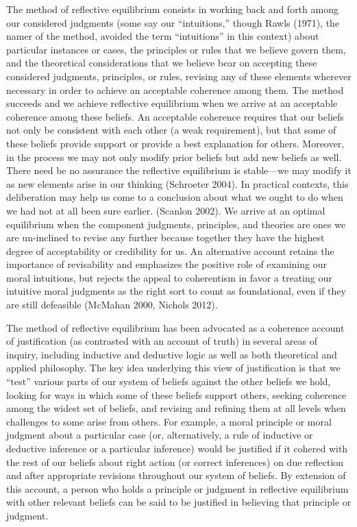 \documentclass[]{article}
\begin{document}
The method of reflective equilibrium consists in working back and forth
among our considered judgments (some say our ``intuitions,'' though
Rawls (1971), the namer of the method, avoided the term ``intuitions''
in this context) about particular instances or cases, the principles or
rules that we believe govern them, and the theoretical considerations
that we believe bear on accepting these considered judgments,
principles, or rules, revising any of these elements wherever necessary
in order to achieve an acceptable coherence among them. The method
succeeds and we achieve reflective equilibrium when we arrive at an
acceptable coherence among these beliefs. An acceptable coherence
requires that our beliefs not only be consistent with each other (a weak
requirement), but that some of these beliefs provide support or provide
a best explanation for others. Moreover, in the process we may not only
modify prior beliefs but add new beliefs as well. There need be no
assurance the reflective equilibrium is stable---we may modify it as new
elements arise in our thinking (Schroeter 2004). In practical contexts,
this deliberation may help us come to a conclusion about what we ought
to do when we had not at all been sure earlier. (Scanlon 2002). We
arrive at an optimal equilibrium when the component judgments,
principles, and theories are ones we are un-inclined to revise any
further because together they have the highest degree of acceptability
or credibility for us. An alternative account retains the importance of
revisability and emphasizes the positive role of examining our moral
intuitions, but rejects the appeal to coherentism in favor a treating
our intuitive moral judgments as the right sort to count as
foundational, even if they are still defeasible (McMahan 2000, Nichols
2012).

The method of reflective equilibrium has been advocated as a coherence
account of justification (as contrasted with an account of truth) in
several areas of inquiry, including inductive and deductive logic as
well as both theoretical and applied philosophy. The key idea underlying
this view of justification is that we ``test'' various parts of our
system of beliefs against the other beliefs we hold, looking for ways in
which some of these beliefs support others, seeking coherence among the
widest set of beliefs, and revising and refining them at all levels when
challenges to some arise from others. For example, a moral principle or
moral judgment about a particular case (or, alternatively, a rule of
inductive or deductive inference or a particular inference) would be
justified if it cohered with the rest of our beliefs about right action
(or correct inferences) on due reflection and after appropriate
revisions throughout our system of beliefs. By extension of this
account, a person who holds a principle or judgment in reflective
equilibrium with other relevant beliefs can be said to be justified in
believing that principle or judgment.
\end{document}
